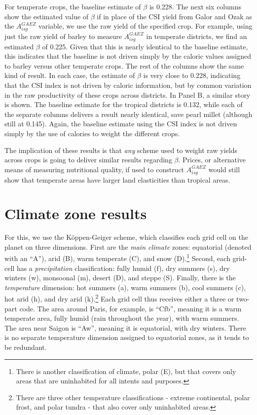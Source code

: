 \documentclass[11pt]{article}
\begin{document}
For temperate crops, the baseline estimate of $\beta$ is 0.228. The next six columns show the estimated value of $\beta$ if in place of the CSI yield from Galor and Ozak as the $A^{GAEZ}_{isg}$ variable, we use the raw yield of the specified crop. For example, using just the raw yield of barley to measure $A^{GAEZ}_{isg}$ in temperate districts, we find an estimated $\beta$ of 0.225. Given that this is nearly identical to the baseline estimate, this indicates that the baseline is not driven simply by the caloric values assigned to barley versus other temperate crops. The rest of the columns show the same kind of result. In each case, the estimate of $\beta$ is very close to 0.228, indicating that the CSI index is not driven by caloric information, but by common variation in the raw productivity of these crops across districts. In Panel B, a similar story is shown. The baseline estimate for the tropical districts is 0.132, while each of the separate columns delivers a result nearly identical, save pearl millet (although still at 0.145). Again, the baseline estimate using the CSI index is not driven simply by the use of calories to weight the different crops.

The implication of these results is that \textit{any} scheme used to weight raw yields across crops is going to deliver similar results regarding $\beta$. Prices, or alternative means of measuring nutritional quality, if used to construct $A^{GAEZ}_{isg}$ would still show that temperate areas have larger land elasticities than tropical areas.

\section{Climate zone results}
For this, we use the K{\"o}ppen-Geiger scheme, which classifies each grid cell on the planet on three dimensions. First are the \textit{main climate} zones: equatorial (denoted with an ``A''), arid (B), warm temperate (C), and snow (D).\footnote{There is another classification of climate, polar (E), but that covers only areas that are uninhabited for all intents and purposes.} Second, each grid-cell has a \textit{precipitation} classification: fully humid (f), dry summers (s), dry winters (w), monsoonal (m), desert (D), and steppe (S). Finally, there is the \textit{temperature} dimension: hot summers (a), warm summers (b), cool summers (c), hot arid (h), and dry arid (k).\footnote{There are three other temperature classifications - extreme continental, polar frost, and polar tundra - that also cover only uninhabited areas.} Each grid cell thus receives either a three or two-part code. The area around Paris, for example, is ``Cfb'', meaning it is a warm temperate area, fully humid (rain throughout the year), with warm summers. The area near Saigon is ``Aw'', meaning it is equatorial, with dry winters. There is no separate temperature dimension assigned to equatorial zones, as it tends to be redundant.
\end{document}
